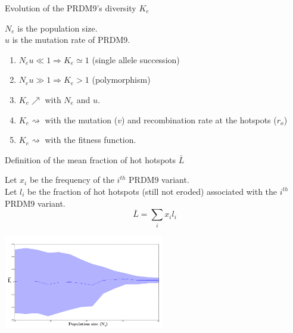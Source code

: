 \documentclass[10pt]{beamer}
\begin{document}
\begin{frame}
	\begin{center}
		\Large
    	Evolution of the PRDM9's diversity $K_e$ 
	\end{center}
	$ N_e $ is the population size. \\ 
	$ u $ is the mutation rate of PRDM9. \\
	\begin{enumerate}
		\item $ N_e u \ll 1 \Rightarrow  K_e \simeq 1$ (single allele succession)
		\item $ N_e u \gg 1 \Rightarrow  K_e > 1 $ (polymorphism)
		
		\item $K_e \nearrow$ with $N_e$ and $u$.
		
		\item $K_e \rightsquigarrow$ with the mutation ($v$) and recombination rate at the hotspots ($r_o$)
		
		\item $K_e \rightsquigarrow$ with the fitness function.
	\end{enumerate}
\end{frame}


\begin{frame}
	\begin{center}
		\Large
    	Definition of the mean fraction of hot hotspots $\bar{L}$ 
    \end{center}
	Let $x_i$ be the frequency of the $i^{th}$ PRDM9 variant.\\
	Let $l_i$ be the fraction of hot hotspots (still not eroded) associated with the $i^{th}$ PRDM9 variant.\\

    \[ \bar{L} =  \sum_i x_i l_i   \]
	\begin{center}
       \includegraphics[width=7cm]{Images/ne-mean-erosion.png}
	\end{center}
\end{frame}
\end{document}
